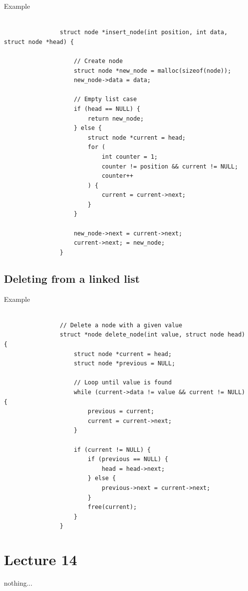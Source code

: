\documentclass{article}
\begin{document}
		\begin{question}{Example}
			\begin{verbatim}
				
				struct node *insert_node(int position, int data, struct node *head) {

					// Create node
					struct node *new_node = malloc(sizeof(node));
					new_node->data = data;

					// Empty list case
					if (head == NULL) {
						return new_node;
					} else {
						struct node *current = head;
						for (
							int counter = 1;
							counter != position && current != NULL;
							counter++
						) {
							current = current->next;
						}
					}

					new_node->next = current->next;
					current->next; = new_node;
				}

			\end{verbatim}
		\end{question}

	\subsection{Deleting from a linked list}
		
		\begin{question}{Example}
			\begin{verbatim}
				
				// Delete a node with a given value
				struct *node delete_node(int value, struct node head) {
					struct node *current = head;
					struct node *previous = NULL;

					// Loop until value is found
					while (current->data != value && current != NULL) {
						previous = current;
						current = current->next;
					}

					if (current != NULL) {
						if (previous == NULL) {
							head = head->next;
						} else {
							previous->next = current->next;
						}
						free(current);
					}
				}

			\end{verbatim}
		\end{question}

\newpage

\section{Lecture 14}

	nothing...
\end{document}
